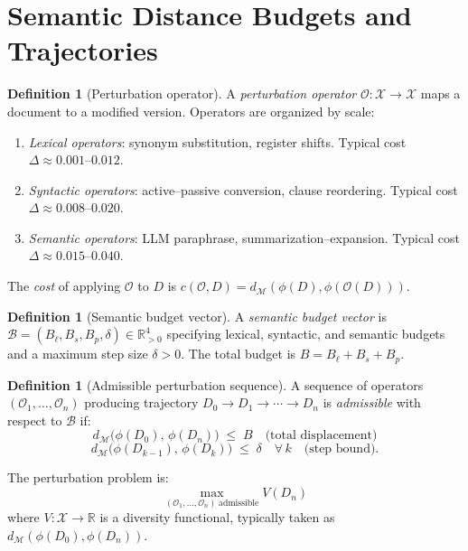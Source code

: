 \documentclass[12pt, a4paper]{article}
\theoremstyle{plain}
\theoremstyle{definition}
\newtheorem{definition}[theorem]{Definition}
\theoremstyle{remark}
\newcommand{\calX}{\mathcal{X}}
\newcommand{\calM}{\mathcal{M}}
\newcommand{\calO}{\mathcal{O}}
\newcommand{\bR}{\mathbb{R}}
\newcommand{\dM}{d_{\calM}}
\begin{document}
\section{Semantic Distance Budgets and Trajectories}
\label{sec:budget}

\begin{definition}[Perturbation operator]
\label{def:operator}
A \emph{perturbation operator} $\calO : \calX \to \calX$ maps a document to a
modified version.  Operators are organized by scale:
\begin{enumerate}[label=(\roman*)]
  \item \emph{Lexical operators}: synonym substitution, register shifts.
        Typical cost $\Delta \approx 0.001$--$0.012$.
  \item \emph{Syntactic operators}: active--passive conversion, clause reordering.
        Typical cost $\Delta \approx 0.008$--$0.020$.
  \item \emph{Semantic operators}: LLM paraphrase, summarization--expansion.
        Typical cost $\Delta \approx 0.015$--$0.040$.
\end{enumerate}
The \emph{cost} of applying $\calO$ to $D$ is
$c(\calO, D) = \dM(\phi(D), \phi(\calO(D)))$.
\end{definition}

\begin{definition}[Semantic budget vector]
\label{def:budget}
A \emph{semantic budget vector} is
$\mathcal{B} = (B_\ell, B_s, B_p, \delta) \in \bR_{>0}^4$
specifying lexical, syntactic, and semantic budgets and a maximum step size
$\delta > 0$.  The total budget is $B = B_\ell + B_s + B_p$.
\end{definition}

\begin{definition}[Admissible perturbation sequence]
\label{def:admissible}
A sequence of operators $(\calO_1, \ldots, \calO_n)$ producing trajectory
$D_0 \to D_1 \to \cdots \to D_n$ is \emph{admissible} with respect to
$\mathcal{B}$ if:
\[
   \dM\bigl(\phi(D_0),\, \phi(D_n)\bigr) \;\le\; B
   \quad \text{(total displacement)}
\]
\[
   \dM\bigl(\phi(D_{k-1}),\, \phi(D_k)\bigr) \;\le\; \delta
   \quad \forall\, k \quad \text{(step bound).}
\]
\end{definition}

The perturbation problem is:
\begin{equation}
\label{eq:opt}
   \max_{(\calO_1,\ldots,\calO_n)\;\text{admissible}} V(D_n)
\end{equation}
where $V : \calX \to \bR$ is a diversity functional, typically taken as
$\dM(\phi(D_0), \phi(D_n))$.
\end{document}
